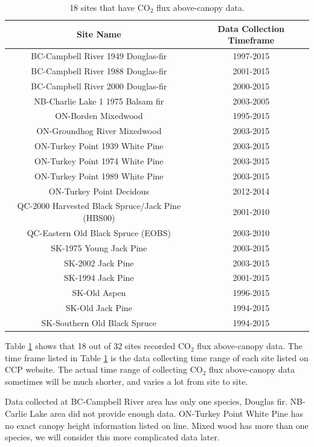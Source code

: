 \documentclass{article}
\begin{document}
\begin{table}[!ht]
\centering
\caption{18 sites that have CO$_2$ flux above-canopy data.}
\label{Tab:havedata}
\begin{tabular}{cc}
\hline
\textbf{Site Name} & \textbf{Data Collection Timeframe}  \\
\hline
BC-Campbell River 1949 Douglas-fir & 1997-2015  \\
BC-Campbell River 1988 Douglas-fir & 2001-2015  \\
BC-Campbell River 2000 Douglas-fir & 2000-2015  \\
\hline
NB-Charlie Lake 1 1975 Balsam fir & 2003-2005  \\
\hline
ON-Borden Mixedwood & 1995-2015  \\
ON-Groundhog River Mixedwood & 2003-2015  \\
ON-Turkey Point 1939 White Pine & 2003-2015  \\
ON-Turkey Point 1974 White Pine & 2003-2015  \\
ON-Turkey Point 1989 White Pine & 2003-2015  \\
ON-Turkey Point Decidous & 2012-2014  \\
\hline
QC-2000 Harvested Black Spruce/Jack Pine (HBS00) & 2001-2010 \\
QC-Eastern Old Black Spruce (EOBS) & 2003-2010 \\
\hline
SK-1975 Young Jack Pine & 2003-2015\\
SK-2002 Jack Pine & 2003-2015 \\
SK-1994 Jack Pine & 2001-2015 \\
SK-Old Aspen & 1996-2015 \\
SK-Old Jack Pine &  1994-2015 \\
SK-Southern Old Black Spruce & 1994-2015\\
\hline
\end{tabular}
\end{table}

Table \ref{Tab:havedata} shows that 18 out of 32 sites recorded CO$_2$ flux above-canopy data. 
The time frame listed in Table \ref{Tab:havedata} is the data collecting time range of each site listed on CCP website. The actual time range of collecting CO$_2$ flux above-canopy data sometimes will be much shorter, and varies a lot from site to site. 

Data collected at BC-Campbell River area has only one species, Douglas fir. NB-Carlie Lake area did not provide enough data. ON-Turkey Point White Pine has no exact canopy height information listed on line. Mixed wood has more than one species, we will consider this more complicated data later.
\end{document}
